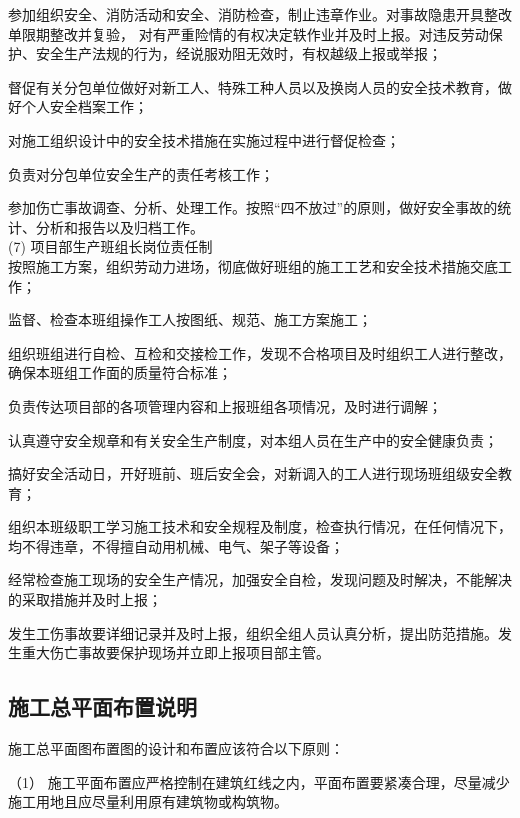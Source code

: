  参加组织安全、消防活动和安全、消防检查，制止违章作业。对事故隐患开具整改单限期整改并复验，
对有严重险情的有权决定轶作业并及时上报。对违反劳动保护、安全生产法规的行为，经说服劝阻无效时，有权越级上报或举报；

 督促有关分包单位做好对新工人、特殊工种人员以及换岗人员的安全技术教育，做好个人安全档案工作；

 对施工组织设计中的安全技术措施在实施过程中进行督促检查；

 负责对分包单位安全生产的责任考核工作；

 参加伤亡事故调查、分析、处理工作。按照“四不放过”的原则，做好安全事故的统计、分析和报告以及归档工作。\\

(7) 项目部生产班组长岗位责任制\\

 按照施工方案，组织劳动力进场，彻底做好班组的施工工艺和安全技术措施交底工作；

 监督、检查本班组操作工人按图纸、规范、施工方案施工；

 组织班组进行自检、互检和交接检工作，发现不合格项目及时组织工人进行整改，确保本班组工作面的质量符合标准；

 负责传达项目部的各项管理内容和上报班组各项情况，及时进行调解；

 认真遵守安全规章和有关安全生产制度，对本组人员在生产中的安全健康负责；

 搞好安全活动日，开好班前、班后安全会，对新调入的工人进行现场班组级安全教育；

 组织本班级职工学习施工技术和安全规程及制度，检查执行情况，在任何情况下，均不得违章，不得擅自动用机械、电气、架子等设备；

 经常检查施工现场的安全生产情况，加强安全自检，发现问题及时解决，不能解决的采取措施并及时上报；

 发生工伤事故要详细记录并及时上报，组织全组人员认真分析，提出防范措施。发生重大伤亡事故要保护现场并立即上报项目部主管。\\

\subsection{施工总平面布置说明}

施工总平面图布置图的设计和布置应该符合以下原则：

（1） 施工平面布置应严格控制在建筑红线之内，平面布置要紧凑合理，尽量减少施工用地且应尽量利用原有建筑物或构筑物。


